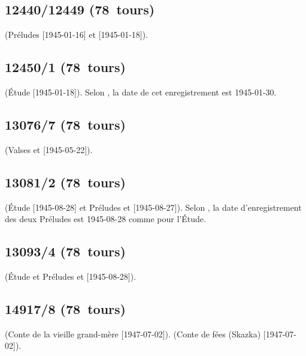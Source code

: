 \subsection{12440/12449 (78~tours)}

\Rachmaninov{} (Préludes   [1945-01-16] et 
 [1945-01-18]).

\subsection{12450/1 (78~tours)}

\Scriabine{} (Étude   [1945-01-18]).
Selon \FMalik{} \citep[voir][p.~72]{Malik}, la date de cet enregistrement
est 1945-01-30.

\subsection{13076/7 (78~tours)}

\Chopin{} (Valses   et  
[1945-05-22]).

\subsection{13081/2 (78~tours)}

\Scriabine{} (Étude   [1945-08-28] et Préludes 
 et   [1945-08-27]).
Selon \FMalik{} \citep[voir][p.~74]{Malik}, la date d'enregistrement des
deux Préludes est 1945-08-28 comme pour l'\hbox{Étude}.

\subsection{13093/4 (78~tours)}

\Scriabine{} (Étude   et Préludes  
et   [1945-08-28]).

\subsection{14917/8 (78~tours)}

\Prokofiev{} (Conte de la vieille grand-mère  
[1947-07-02]).
\Medtner{} (Conte de fées (Skazka)   [1947-07-02]).

